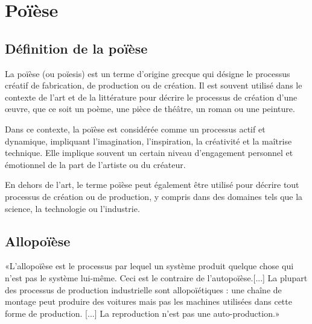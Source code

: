\section{Poïèse}

\subsection{Définition de la poïèse}

La poïèse (ou poïesis) est un terme d'origine grecque qui désigne le processus créatif de fabrication, de production ou de création. Il est souvent utilisé dans le contexte de l'art et de la littérature pour décrire le processus de création d'une œuvre, que ce soit un poème, une pièce de théâtre, un roman ou une peinture.

Dans ce contexte, la poïèse est considérée comme un processus actif et dynamique, impliquant l'imagination, l'inspiration, la créativité et la maîtrise technique. Elle implique souvent un certain niveau d'engagement personnel et émotionnel de la part de l'artiste\label{poiese_artise} ou du créateur.

En dehors de l'art, le terme poïèse peut également être utilisé pour décrire tout processus de création ou de production, y compris dans des domaines tels que la science, la technologie ou l'industrie.

\subsection{Allopoïèse}

«L'allopoïèse est le processus par lequel un système produit quelque chose qui n'est pas le système lui-même. Ceci est le contraire de l'autopoïèse.[...] La plupart des processus de production industrielle sont allopoïétiques : une chaîne de montage peut produire des voitures mais pas les machines utilisées dans cette forme de production. [...] La reproduction n'est pas une auto-production.»~\cite{wiki_allopoiesis_2018}~\cite{vuc_allopoiesis_2018}




